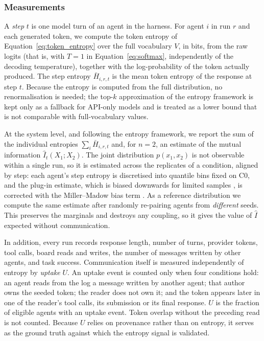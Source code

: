 \subsubsection{Measurements}
\label{sec:measurements}

A \emph{step} $t$ is one model turn of an agent in the harness. For agent $i$ in run $r$ and each generated token, we compute the token entropy of Equation~\eqref{eq:token_entropy} over the full vocabulary $V$, in bits, from the raw logits (that is, with $T = 1$ in Equation~\eqref{eq:softmax}, independently of the decoding temperature), together with the log-probability of the token actually produced. The step entropy $\bar{H}_{i,r,t}$ is the mean token entropy of the response at step $t$. Because the entropy is computed from the full distribution, no renormalisation is needed; the top-$k$ approximation of the entropy framework is kept only as a fallback for API-only models and is treated as a lower bound that is not comparable with full-vocabulary values.

At the system level, and following the entropy framework, we report the sum of the individual entropies $\sum_i \bar{H}_{i,r,t}$ and, for $n = 2$, an estimate of the mutual information $\hat{I}_t(X_1; X_2)$. The joint distribution $p(x_1, x_2)$ is not observable within a single run, so it is estimated across the replicates of a condition, aligned by step: each agent's step entropy is discretised into quantile bins fixed on C0, and the plug-in estimate, which is biased downwards for limited samples \parencite{paninski2003estimation}, is corrected with the Miller--Madow bias term \parencite{miller1955bias}. As a reference distribution we compute the same estimate after randomly re-pairing agents from \emph{different} seeds. This preserves the marginals and destroys any coupling, so it gives the value of $\hat{I}$ expected without communication.

In addition, every run records response length, number of turns, provider tokens, tool calls, board reads and writes, the number of messages written by other agents, and task success. Communication itself is measured independently of entropy by \emph{uptake} $U$. An uptake event is counted only when four conditions hold: an agent reads from the log a message written by another agent; that author owns the seeded token; the reader does not own it; and the token appears later in one of the reader's tool calls, its submission or its final response. $U$ is the fraction of eligible agents with an uptake event. Token overlap without the preceding read is not counted. Because $U$ relies on provenance rather than on entropy, it serves as the ground truth against which the entropy signal is validated.

